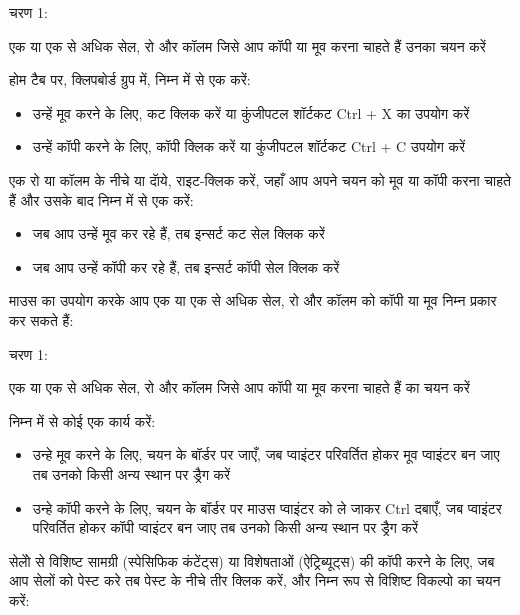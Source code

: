 \begin{descriptionSimple}{चरण 1:}
\item[चरण 1]  एक या एक से अधिक सेल, रो और कॉलम जिसे आप कॉपी या मूव करना चाहते हैं उनका चयन करें
\item[चरण 2]  होम टैब पर, क्लिपबोर्ड ग्रुप में, निम्न में से एक करें:
		\begin{itemize}
		\item उन्हें मूव करने के लिए, कट क्लिक करें या कुंजीपटल शॉर्टकट  {\eng Ctrl + X}  का उपयोग करें	
		\item उन्हें कॉपी करने के लिए, कॉपी क्लिक करें या कुंजीपटल शॉर्टकट  {\eng Ctrl + C}  उपयोग करें
		\end{itemize}	
\item[चरण 3] एक रो या कॉलम के नीचे या दॅाये, राइट-क्लिक करें, जहाँ आप अपने चयन को मूव या कॉपी करना चाहते हैं और उसके बाद निम्न में से एक करें:
		\begin{itemize}
		\item जब आप उन्हें मूव कर रहे हैं, तब इन्सर्ट कट सेल क्लिक करें
		\item जब आप उन्हें कॉपी कर रहे हैं, तब इन्सर्ट कॉपी सेल क्लिक करें
		\end{itemize}
\end{descriptionSimple}

माउस का उपयोग करके आप एक या एक से अधिक सेल, रो और कॉलम को कॉपी या मूव निम्न प्रकार कर सकते हैं:

\begin{descriptionSimple}{चरण 1:}
\item[चरण 1]  एक या एक से अधिक सेल, रो और कॉलम जिसे आप कॉपी या मूव करना चाहते हैं का चयन करें
\item[चरण 2]  निम्न में से कोई एक कार्य करें:
		\begin{itemize}
		\item उन्हे मूव करने के लिए, चयन के बॉर्डर पर जाएँ, जब प्वाइंटर परिवर्तित होकर मूव प्वाइंटर बन जाए तब उनको किसी अन्य स्थान पर ड्रैग करें
		\item उन्हे कॉपी करने के लिए, चयन के बॉर्डर पर माउस प्वाइंटर को ले जाकर  {\eng Ctrl}  दबाएँ, जब प्वाइंटर परिवर्तित होकर कॉपी प्वाइंटर बन जाए तब उनको किसी अन्य स्थान पर ड्रैग करें
		\end{itemize}
\end{descriptionSimple}

सेलोें से विशिष्ट सामग्री (स्पेसिफिक कंटेंट्स) या विशेषताओं (ऐट्रिब्यूट्स) की कॉपी करने के लिए, जब आप सेलों को पेस्ट करे तब पेस्ट के नीचे तीर क्लिक करें, और निम्न रूप से विशिष्ट विकल्पो का चयन करें:

